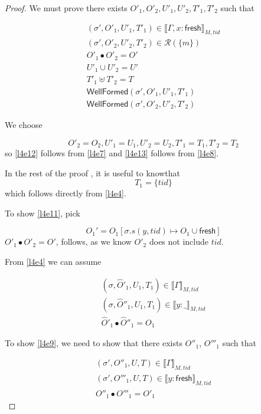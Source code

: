 \begin{proof}
We must prove there exists $O'_{1}, O'_{2}, U'_{1}, U'_{2}, T'_{1}, T'_{2}$ such that


\begin{gather}\label{l4e9}
(\sigma',O'_{1},U'_{1}, T'_{1}) \in \llbracket \Gamma,x:\mathsf{fresh}  \rrbracket_{M,tid}
\\
\label{l4e10}
(\sigma',O'_{2},U'_{2}, T'_{2}) \in \mathcal{R}(\{m\})
\\
 \label{l4e11}
O'_{1} \bullet O'_{2} = O'
\\
 \label{l4e12}
U'_{1} \cup U'_{2} = U' 
\\
 \label{l4e13}
T'_{1} \uplus T'_{2} = T
\\
\label{l4wfp1}
\textsf{WellFormed}(\sigma',O'_{1},U'_{1},T'_{1})
\\
\label{l4wfp2}
\textsf{WellFormed}(\sigma',O'_{2},U'_{2},T'_{2})
\end{gather}

We choose 

\[O'_{2} = O_{2}, U'_{1} = U_{1}, U'_{2} = U_{2}, T'_{1} = T_{1}, T'_{2} = T_{2}  \] so \ref{l4e12} follows from \ref{l4e7} and \ref{l4e13} follows from \ref{l4e8}.

In the rest of the proof , it is useful to knowthat
\begin{equation} \label{l4e14}
T_{1} = \{tid\}
\end{equation}
which follows directly from \ref{l4e4}.

To show \ref{l4e11}, pick

\[O_{1}' = O_{1}[\sigma.s(y,tid) \mapsto O_{1} \cup \mathsf{fresh} ]\]
$O'_{1} \bullet O'_{2} = O'$, follows, as we know $O'_{2}$ does not include $tid$.


From \ref{l4e4} we can assume

\begin{gather} \label{l4e14}
(\sigma,\hat{O}'_{1},U_{1},T_{1})  \in \llbracket \Gamma \rrbracket_{M,tid}
\\
 \label{l4e15}
(\sigma,\hat{O}''_{1},U_{1},T_{1})  \in \llbracket y:\_ \rrbracket_{M,tid}
\\
 \label{l4e16}
\hat{O}'_{1} \bullet \hat{O}''_{1} = O_{1}
\end{gather}


To show \ref{l4e9}, we need to show that there exists  $O''_{1}$, $O'''_{1}$ such that 

\begin{gather} 	\label{l4e17}
(\sigma', O''_{1},U ,T) \in \llbracket \Gamma \rrbracket_{M,tid}
\\
 \label{l4e18}
(\sigma', O'''_{1},U ,T) \in \llbracket y:\mathsf{fresh} \rrbracket_{M,tid}
\\
\label{l4e19}
O''_{1} \bullet O'''_{1} = O'_{1}
\end{gather}


\end{proof}
